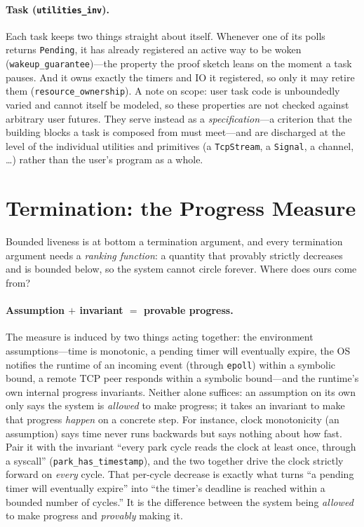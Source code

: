 \documentclass[11pt]{article}
\newcommand{\asm}[1]{\textcolor{cAssume}{#1}}
\newcommand{\inv}[1]{\textcolor{cInv}{#1}}
\theoremstyle{plain}
\theoremstyle{definition}
\begin{document}
\paragraph{Task (\texttt{utilities\_inv}).} Each task keeps two things straight about itself.
Whenever one of its polls returns \texttt{Pending}, it has already registered an active way to
be woken (\lstinline|wakeup_guarantee|)---the property the proof sketch leans on the moment a
task pauses. And it owns exactly the timers and IO it registered, so only it may retire them
(\lstinline|resource_ownership|). A note on scope: user task code is unboundedly varied and
cannot itself be modeled, so these properties are not checked against arbitrary user futures.
They serve instead as a \emph{specification}---a criterion that the building blocks a task is
composed from must meet---and are discharged at the level of the individual utilities and
primitives (a \texttt{TcpStream}, a \texttt{Signal}, a channel, \dots) rather than the user's
program as a whole.

\section{Termination: the Progress Measure}
\label{sec:measure}

Bounded liveness is at bottom a termination argument, and every termination argument needs a
\emph{ranking function}: a quantity that provably strictly decreases and is bounded below, so
the system cannot circle forever. Where does ours come from?

\paragraph{Assumption \texorpdfstring{$+$}{+} invariant \texorpdfstring{$=$}{=} provable
progress.} The measure is induced by two things acting together: the \asm{environment
assumptions}---time is monotonic, a pending timer will eventually expire, the OS notifies the
runtime of an incoming event (through \texttt{epoll}) within a symbolic bound, a remote TCP
peer responds within a symbolic bound---and the runtime's own \inv{internal progress
invariants}. Neither alone suffices: an assumption on its own only says the system is
\emph{allowed} to make progress; it takes an invariant to make that progress \emph{happen} on
a concrete step. For instance, clock monotonicity (\asm{an assumption}) says time never runs
backwards but says nothing about how fast. Pair it with the invariant \inv{``every park cycle
reads the clock at least once, through a syscall''} (\lstinline|park_has_timestamp|), and the
two together drive the clock strictly forward on \emph{every} cycle. That per-cycle decrease
is exactly what turns ``a pending timer will eventually expire'' into ``the timer's deadline
is reached within a bounded number of cycles.'' It is the difference between the system being
\emph{allowed} to make progress and \emph{provably} making it.
\end{document}
